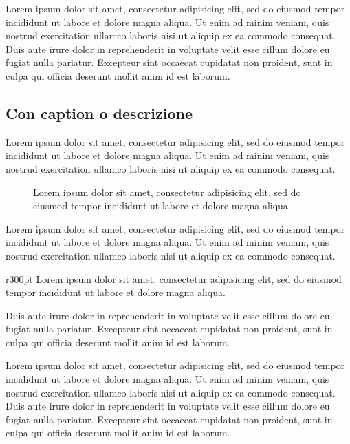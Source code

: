 \documentclass[a4paper, 12pt]{report}
\begin{document}
Lorem ipsum dolor sit amet, consectetur adipisicing elit, sed do eiusmod
tempor incididunt ut labore et dolore magna aliqua. Ut enim ad minim veniam,
quis nostrud exercitation ullamco laboris nisi ut aliquip ex ea commodo
consequat. Duis aute irure dolor in reprehenderit in voluptate velit esse
cillum dolore eu fugiat nulla pariatur. Excepteur sint occaecat cupidatat non
proident, sunt in culpa qui officia deserunt mollit anim id est laborum.

\subsection*{Con caption o descrizione}

Lorem ipsum dolor sit amet, consectetur adipisicing elit, sed do eiusmod
tempor incididunt ut labore et dolore magna aliqua. Ut enim ad minim veniam,
quis nostrud exercitation ullamco laboris nisi ut aliquip ex ea commodo consequat.

\begin{figure}[h]
	\centering
	\caption{
		Lorem ipsum dolor sit amet, consectetur adipisicing elit, sed do eiusmod
		tempor incididunt ut labore et dolore magna aliqua.
	}
\end{figure}

Lorem ipsum dolor sit amet, consectetur adipisicing elit, sed do eiusmod
tempor incididunt ut labore et dolore magna aliqua. Ut enim ad minim veniam,
quis nostrud exercitation ullamco laboris nisi ut aliquip ex ea commodo consequat.

\begin{wrapfigure}{r}{300pt}
	\centering
	\vspace{-1.5\baselineskip}
	{\footnotesize
		Lorem ipsum dolor sit amet, consectetur adipisicing elit, sed do eiusmod
		tempor incididunt ut labore et dolore magna aliqua.
	}
	\vspace{-1\baselineskip}
\end{wrapfigure}

Duis aute irure dolor in reprehenderit in voluptate velit esse
cillum dolore eu fugiat nulla pariatur. Excepteur sint occaecat cupidatat non
proident, sunt in culpa qui officia deserunt mollit anim id est laborum.

Lorem ipsum dolor sit amet, consectetur adipisicing elit, sed do eiusmod
tempor incididunt ut labore et dolore magna aliqua. Ut enim ad minim veniam,
quis nostrud exercitation ullamco laboris nisi ut aliquip ex ea commodo
consequat. Duis aute irure dolor in reprehenderit in voluptate velit esse
cillum dolore eu fugiat nulla pariatur. Excepteur sint occaecat cupidatat non
proident, sunt in culpa qui officia deserunt mollit anim id est laborum.
\end{document}
